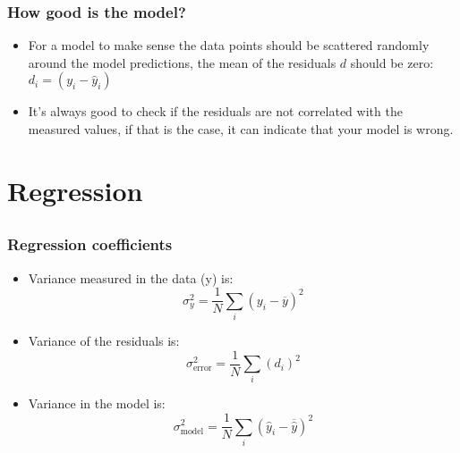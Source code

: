 
\begin{frame}[fragile] 
  \frametitle{How good is the model?}
  

  \begin{itemize}
    \item For a model to make sense the data points should be scattered randomly around the model predictions, the mean of the residuals $d$ should be zero: $d_i = \left( y_i - \hat{y}_i\right)$
    \item It’s always good to check if the residuals are not correlated with the measured values, if that is the case, it can indicate that your model is wrong.
  \end{itemize}
\end{frame}

\section{Regression}
\subsection*{}
\begin{frame}[fragile] 
  \frametitle{Regression coefficients}
    \begin{itemize}
    \item Variance measured in the data (y) is:
    \[
      \sigma^2_y = \frac{1}{N} \sum_i \left (y_i - \overline{y}\right)^2
    \]
    \item Variance of the residuals is:
    \[
      \sigma^2_\text{error} = \frac{1}{N} \sum_i \left (d_i\right)^2
    \]
        \item Variance in the model is:
    \[
      \sigma^2_\text{model} = \frac{1}{N} \sum_i \left (\hat{y}_i - \overline{\hat{y}}\right)^2
    \]
  \end{itemize}
\end{frame}

